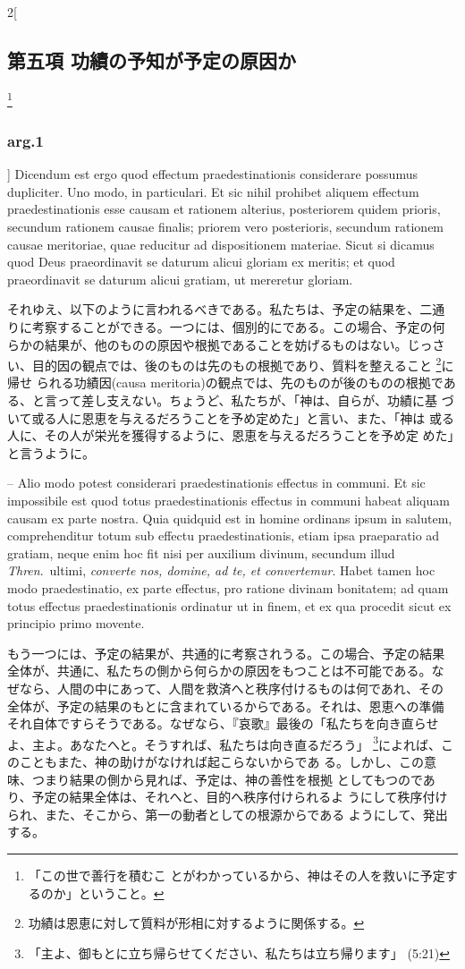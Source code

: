 \documentclass[paper=a4paper,fontsize=10pt,jafontsize=9pt,titlepage]{jlreq}
\begin{document}
\begin{paracol}{2}[\subsection{第五項 功績の予知が予定の原因か}\footnote{「この世で善行を積むこ とがわかっているから、神はその人を救いに予定するのか」ということ。}\subsubsection{arg.1}]
Dicendum
est ergo quod effectum praedestinationis considerare possumus
dupliciter. Uno modo, in particulari. Et sic nihil prohibet aliquem
effectum praedestinationis esse causam et rationem alterius, posteriorem
quidem prioris, secundum rationem causae finalis; priorem vero
posterioris, secundum rationem causae meritoriae, quae reducitur ad
dispositionem materiae. Sicut si dicamus quod Deus praeordinavit se
daturum alicui gloriam ex meritis; et quod praeordinavit se daturum
alicui gratiam, ut mereretur gloriam.


\switchcolumn


それゆえ、以下のように言われるべきである。私たちは、予定の結果を、二通
りに考察することができる。一つには、個別的にである。この場合、予定の何
らかの結果が、他のものの原因や根拠であることを妨げるものはない。じっさ
い、目的因の観点では、後のものは先のもの根拠であり、質料を整えること
\footnote{功績は恩恵に対して質料が形相に対するように関係する。}に帰せ
られる功績因(causa meritoria)の観点では、先のものが後のものの根拠であ
る、と言って差し支えない。ちょうど、私たちが、「神は、自らが、功績に基
づいて或る人に恩恵を与えるだろうことを予め定めた」と言い、また、「神は
或る人に、その人が栄光を獲得するように、恩恵を与えるだろうことを予め定
めた」と言うように。


\switchcolumn*


-- Alio modo potest considerari
praedestinationis effectus in communi. Et sic impossibile est quod totus
praedestinationis effectus in communi habeat aliquam causam ex parte
nostra. Quia quidquid est in homine ordinans ipsum in salutem,
comprehenditur totum sub effectu praedestinationis, etiam ipsa
praeparatio ad gratiam, neque enim hoc fit nisi per auxilium divinum,
secundum illud {\itshape Thren}.~ultimi, {\itshape converte nos, domine, ad te, et
convertemur}. Habet tamen hoc modo praedestinatio, ex parte effectus, pro
ratione divinam bonitatem; ad quam totus effectus praedestinationis
ordinatur ut in finem, et ex qua procedit sicut ex principio primo
movente.


\switchcolumn


もう一つには、予定の結果が、共通的に考察されうる。この場合、予定の結果
全体が、共通に、私たちの側から何らかの原因をもつことは不可能である。な
ぜなら、人間の中にあって、人間を救済へと秩序付けるものは何であれ、その
全体が、予定の結果のもとに含まれているからである。それは、恩恵への準備
それ自体ですらそうである。なぜなら、『哀歌』最後の「私たちを向き直らせ
よ、主よ。あなたへと。そうすれば、私たちは向き直るだろう」
\footnote{「主よ、御もとに立ち帰らせてください、私たちは立ち帰ります」
(5:21)}によれば、このこともまた、神の助けがなければ起こらないからであ
る。しかし、この意味、つまり結果の側から見れば、予定は、神の善性を根拠
としてもつのであり、予定の結果全体は、それへと、目的へ秩序付けられるよ
うにして秩序付けられ、また、そこから、第一の動者としての根源からである
ようにして、発出する。



\end{paracol}
\end{document}
